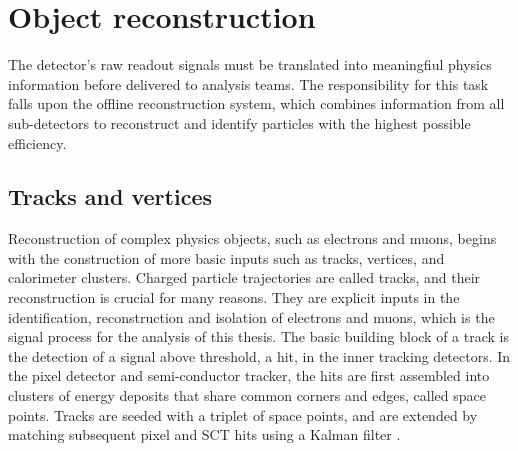 

\section{Object reconstruction}

The \ATLAS detector's raw readout signals must be translated into meaningfiul physics information before delivered to analysis teams. The responsibility for this task falls upon the offline reconstruction system, which combines information from all sub-detectors to reconstruct and identify particles with the highest possible efficiency. 

\subsection{Tracks and vertices}
\label{ssec:tracksandvertices}

Reconstruction of complex physics objects, such as electrons and muons, begins with the construction of more basic inputs such as tracks, vertices, and calorimeter clusters. 
Charged particle trajectories are called tracks, and their reconstruction is crucial for many reasons. They are explicit inputs in the identification, reconstruction and isolation of electrons and muons, which is the signal process for the analysis of this thesis. The basic building block of a track is the detection of a signal above threshold, a hit, in the inner tracking detectors. In the pixel detector and semi-conductor tracker, the hits are first assembled into clusters of energy deposits that share common corners and edges, called space points. Tracks are seeded with a triplet of space points, and are extended by matching subsequent pixel and SCT hits using a Kalman filter \cite{ATLAS-CONF-2012-042}. 

